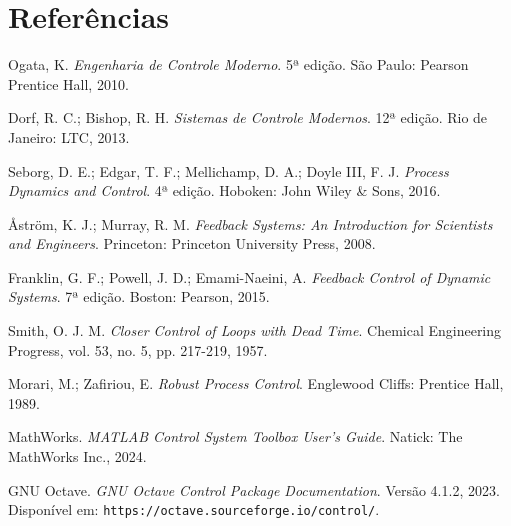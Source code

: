 \documentclass[a4paper,12pt]{article}
\begin{document}
\newpage

\section{Referências}

\begin{thebibliography}{9}

Ogata, K. \textit{Engenharia de Controle Moderno}. 5ª edição. São Paulo: Pearson Prentice Hall, 2010.

Dorf, R. C.; Bishop, R. H. \textit{Sistemas de Controle Modernos}. 12ª edição. Rio de Janeiro: LTC, 2013.

Seborg, D. E.; Edgar, T. F.; Mellichamp, D. A.; Doyle III, F. J. \textit{Process Dynamics and Control}. 4ª edição. Hoboken: John Wiley \& Sons, 2016.

Åström, K. J.; Murray, R. M. \textit{Feedback Systems: An Introduction for Scientists and Engineers}. Princeton: Princeton University Press, 2008.

Franklin, G. F.; Powell, J. D.; Emami-Naeini, A. \textit{Feedback Control of Dynamic Systems}. 7ª edição. Boston: Pearson, 2015.

Smith, O. J. M. \textit{Closer Control of Loops with Dead Time}. Chemical Engineering Progress, vol. 53, no. 5, pp. 217-219, 1957.

Morari, M.; Zafiriou, E. \textit{Robust Process Control}. Englewood Cliffs: Prentice Hall, 1989.

MathWorks. \textit{MATLAB Control System Toolbox User's Guide}. Natick: The MathWorks Inc., 2024.

GNU Octave. \textit{GNU Octave Control Package Documentation}. Versão 4.1.2, 2023. Disponível em: \texttt{https://octave.sourceforge.io/control/}.

\end{thebibliography}
\end{document}
